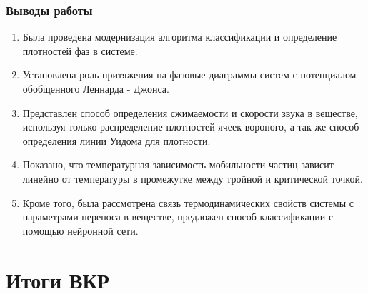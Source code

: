 \documentclass[pdf,hyperref={unicode}]{beamer}
\begin{document}
\begin{frame}
	\transdissolve[duration=0.2]
	\frametitle{Выводы работы}
	\footnotesize{
\begin{enumerate}
\item Была проведена модернизация алгоритма классификации и определение плотностей фаз в системе.

\item Установлена роль притяжения на фазовые диаграммы систем с потенциалом обобщенного Леннарда - Джонса.

\item Представлен способ определения сжимаемости и скорости звука в веществе, используя только распределение плотностей ячеек вороного, а так же способ определения линии Уидома для плотности.

\item Показано, что температурная зависимость мобильности частиц зависит линейно от температуры в промежутке между тройной и критической точкой.

\item Кроме того, была рассмотрена связь термодинамических свойств системы с параметрами переноса в веществе, предложен способ классификации с помощью нейронной сети.

\end{enumerate}
	}
\end{frame}





\section{Итоги ВКР}



\begin{frame}
\end{frame}
\end{document}
